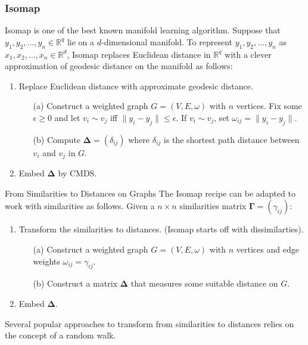 \documentclass[professionalfonts, hyperref={pdfpagelabels=false,
  colorlinks=true, linkcolor=purple}]{beamer}
\begin{document}
\begin{frame}
  \frametitle{Isomap} 
  Isomap \cite{tenebaum00:_global_geomet_framew_nonlin_dimen_reduc} is
  one of the best known manifold learning algorithm. Suppose that
  $y_1, y_2, \dots, y_n \in \mathbb{R}^{q}$ lie on a $d$-dimensional
  manifold. To represent $y_1, y_2, \dots, y_n$ as $x_1, x_2,
  \dots, x_n \in \mathbb{R}^{d}$, Isomap replaces Euclidean distance
  in $\mathbb{R}^{q}$ with a clever approximation of geodesic distance
  on the manifold as follows: 
  \vskip10pt
  \begin{enumerate}
  \item Replace Euclidean distance with approximate geodesic
    distance.
    \begin{enumerate}
    \item[(a)] Construct a weighted graph $G = (V,E,\omega)$ with $n$
      vertices. Fix some $\epsilon \geq 0$ and let $v_i \sim v_j$ iff
      $\|y_i - y_j\| \leq \epsilon$. If $v_i \sim v_j$, set
      $\omega_{ij} = \|y_i - y_j\|$.
    \item[(b)] Compute $\bm{\Delta} = (\delta_{ij})$ where
      $\delta_{ij}$ is the shortest path distance between $v_i$ and
      $v_j$ in $G$.
    \end{enumerate}
   \item Embed $\bm{\Delta}$ by CMDS.
  \end{enumerate}

\end{frame}

\begin{frame}{From Similarities to Distances on Graphs}
 The Isomap recipe can be adapted to work with similarities as
  follows.
  \vskip10pt Given a $n \times n$ similarities matrix $\bm{\Gamma} = (\gamma_{ij})$:
  \vskip5pt
  \begin{enumerate}
  \item Transform the similarities to distances. (Isomap
    starts off with dissimilarties).
    \begin{enumerate}
    \item[(a)]Construct a weighted graph $G = (V,E,\omega)$ with $n$
      vertices and edge weights $\omega_{ij} = \gamma_{ij}$.
    \item[(b)] Construct a matrix $\bm{\Delta}$ that measures some suitable distance on $G$. 
    \end{enumerate}
  \item Embed $\bm{\Delta}$. 
  \end{enumerate}
  \vskip5pt
  Several popular approaches to transform from similarities to
   distances relies on the concept of a \alert{random walk}.
\end{frame}
\end{document}
